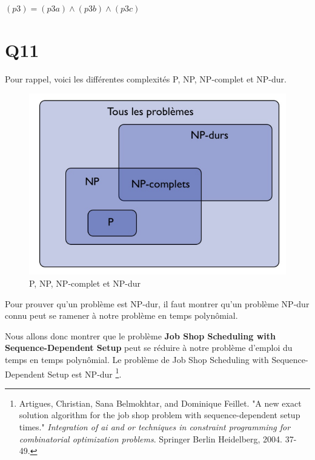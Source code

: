 \documentclass[a4paper,11pt]{article}
\begin{document}
$ (p3) = (p3a) \wedge (p3b) \wedge (p3c)$


\section{Q11}
Pour rappel, voici les différentes complexités P, NP, NP-complet et NP-dur.
\begin{figure}[H]
  \centering
  \includegraphics[scale=0.4]{images/q11-p-np-nphardcomplete.png}
  \caption{\label{} P, NP, NP-complet et NP-dur}
\end{figure}
Pour prouver qu'un problème est NP-dur, il faut montrer qu'un problème NP-dur connu peut se ramener à notre problème en temps polynômial.

Nous allons donc montrer que le problème \textbf{Job Shop Scheduling with Sequence-Dependent Setup} peut se réduire à notre problème d'emploi du temps en temps polynômial. Le problème de Job Shop Scheduling with Sequence-Dependent Setup est NP-dur \footnote{Artigues, Christian, Sana Belmokhtar, and Dominique Feillet. "A new exact solution algorithm for the job shop problem with sequence-dependent setup times." \textit{Integration of ai and or techniques in constraint programming for combinatorial optimization problems}. Springer Berlin Heidelberg, 2004. 37-49.}.
\end{document}
